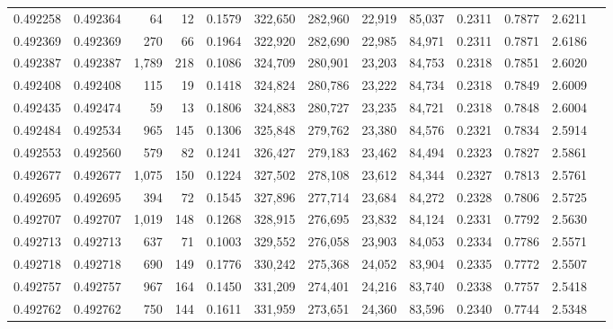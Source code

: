 \begin{tabular}{rrrrrrrrrrrrr}
0.492258 & 0.492364 &    64 &    12 &                                     0.1579 & 322,650 & 282,960 &  22,919 &  85,037 & 0.2311 & 0.7877 & 2.6211 \\
0.492369 & 0.492369 &   270 &    66 &                                     0.1964 & 322,920 & 282,690 &  22,985 &  84,971 & 0.2311 & 0.7871 & 2.6186 \\
0.492387 & 0.492387 & 1,789 &   218 &                                     0.1086 & 324,709 & 280,901 &  23,203 &  84,753 & 0.2318 & 0.7851 & 2.6020 \\
0.492408 & 0.492408 &   115 &    19 &                                     0.1418 & 324,824 & 280,786 &  23,222 &  84,734 & 0.2318 & 0.7849 & 2.6009 \\
0.492435 & 0.492474 &    59 &    13 &                                     0.1806 & 324,883 & 280,727 &  23,235 &  84,721 & 0.2318 & 0.7848 & 2.6004 \\
0.492484 & 0.492534 &   965 &   145 &                                     0.1306 & 325,848 & 279,762 &  23,380 &  84,576 & 0.2321 & 0.7834 & 2.5914 \\
0.492553 & 0.492560 &   579 &    82 &                                     0.1241 & 326,427 & 279,183 &  23,462 &  84,494 & 0.2323 & 0.7827 & 2.5861 \\
0.492677 & 0.492677 & 1,075 &   150 &                                     0.1224 & 327,502 & 278,108 &  23,612 &  84,344 & 0.2327 & 0.7813 & 2.5761 \\
0.492695 & 0.492695 &   394 &    72 &                                     0.1545 & 327,896 & 277,714 &  23,684 &  84,272 & 0.2328 & 0.7806 & 2.5725 \\
0.492707 & 0.492707 & 1,019 &   148 &                                     0.1268 & 328,915 & 276,695 &  23,832 &  84,124 & 0.2331 & 0.7792 & 2.5630 \\
0.492713 & 0.492713 &   637 &    71 &                                     0.1003 & 329,552 & 276,058 &  23,903 &  84,053 & 0.2334 & 0.7786 & 2.5571 \\
0.492718 & 0.492718 &   690 &   149 &                                     0.1776 & 330,242 & 275,368 &  24,052 &  83,904 & 0.2335 & 0.7772 & 2.5507 \\
0.492757 & 0.492757 &   967 &   164 &                                     0.1450 & 331,209 & 274,401 &  24,216 &  83,740 & 0.2338 & 0.7757 & 2.5418 \\
0.492762 & 0.492762 &   750 &   144 &                                     0.1611 & 331,959 & 273,651 &  24,360 &  83,596 & 0.2340 & 0.7744 & 2.5348 \\

\end{tabular}
